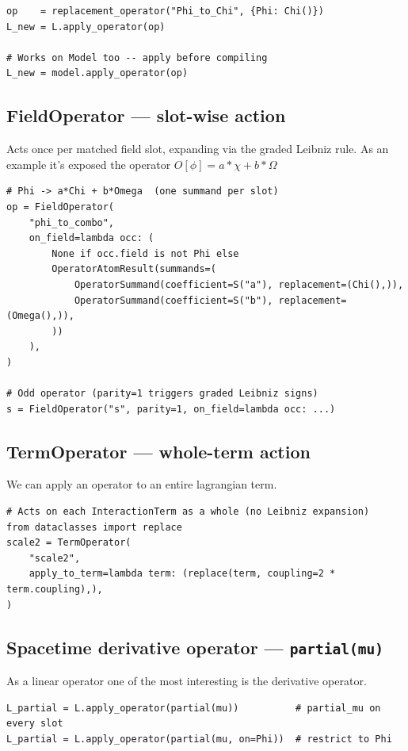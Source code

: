 \begin{verbatim}
op    = replacement_operator("Phi_to_Chi", {Phi: Chi()})
L_new = L.apply_operator(op)

# Works on Model too -- apply before compiling
L_new = model.apply_operator(op)
\end{verbatim}

\subsection*{FieldOperator --- slot-wise action}

Acts once per matched field slot, expanding via the graded Leibniz rule. As an example it's exposed the operator $O[\phi] = a*\chi + b*\Omega$

\begin{verbatim}
# Phi -> a*Chi + b*Omega  (one summand per slot)
op = FieldOperator(
    "phi_to_combo",
    on_field=lambda occ: (
        None if occ.field is not Phi else
        OperatorAtomResult(summands=(
            OperatorSummand(coefficient=S("a"), replacement=(Chi(),)),
            OperatorSummand(coefficient=S("b"), replacement=(Omega(),)),
        ))
    ),
)

# Odd operator (parity=1 triggers graded Leibniz signs)
s = FieldOperator("s", parity=1, on_field=lambda occ: ...)
\end{verbatim}

\subsection*{TermOperator --- whole-term action}
We can apply an operator to an entire lagrangian term.
\begin{verbatim}
# Acts on each InteractionTerm as a whole (no Leibniz expansion)
from dataclasses import replace
scale2 = TermOperator(
    "scale2",
    apply_to_term=lambda term: (replace(term, coupling=2 * term.coupling),),
)
\end{verbatim}

\subsection*{Spacetime derivative operator \texorpdfstring{--- \texttt{partial(mu)}}{}}
As a linear operator one of the most interesting is the derivative operator.
\begin{verbatim}
L_partial = L.apply_operator(partial(mu))          # partial_mu on every slot
L_partial = L.apply_operator(partial(mu, on=Phi))  # restrict to Phi
\end{verbatim}

